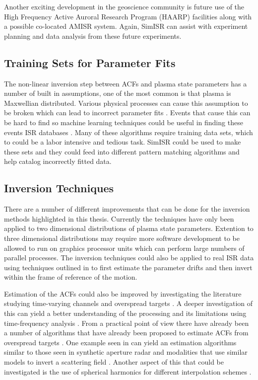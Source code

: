 Another exciting development in the geoscience community is future use of the High Frequency Active Auroral Research Program (HAARP) facilities \citep{Bernhardt:2016il} along with a possible co-located AMISR system. Again, SimISR can assist with experiment planning and data analysis from these future experiments.



\subsection{Training Sets for Parameter Fits}

The non-linear inversion step between ACFs and plasma state parameters has a number of built in assumptions, one of the most common is that plasma is Maxwellian distributed. Various physical processes can cause this assumption to be broken which can lead to incorrect parameter fits \citep{St1979ion,Suvanto1988incoherent,Akbari:2015fv}. Events that cause this can be hard to find so machine learning techniques could be useful in finding these events ISR databases \citep{Duda:2000:PC:954544}. Many of these algorithms require training data sets, which to could be a labor intensive and tedious task. SimISR could be used to make these sets and they could feed into different pattern matching algorithms and help catalog incorrectly fitted data.

\subsection{Inversion Techniques}

There are a number of different improvements that can be done for the inversion methods highlighted in this thesis. Currently the techniques have only been applied to two dimensional distributions of plasma state parameters. Extention to three dimensional distributions may require more software development to be allowed to run on graphics processor units which can perform large numbers of parallel processes. The inversion techniques could also be applied to real ISR data using techniques outlined in \citet{butler:imagingfregiondrifts} to first estimate the parameter drifts and then invert within the frame of reference of the motion.

Estimation of the ACFs could also be improved by investigating the literature studying time-varying channels and overspread targets \citep{Kailath:1962jx,Kailath:1963gh,Pfander:2006hh,Pfander:2015ea}. A deeper investigation of this can yield a better understanding of the processing and its limitations using time-frequency analysis \citep{TFAcohen,Peyrin:1986bh,Jiang:kj}. From a practical point of view there have already been a number of algorithms that have already been proposed to estimate ACFs from overspread targets \citep{Pfander:2015ea,Jiang:kj}. One example seen in \citet{Kay:2003jl} can yield an estimation algorithms similar to those seen in synthetic aperture radar and modalities that use similar models to invert a scattering field \citep{1456966,Ralston:2007hs,richards2014fundamentals}. Another aspect of this that could be investigated is the use of spherical harmonics for different interpolation schemes \citep{Baddour:2010cq,Baddour:2009jm,Baddour:2012bd}.

